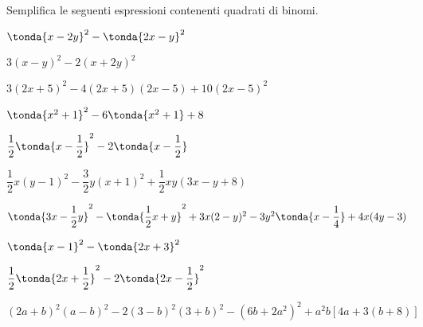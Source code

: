\begin{esercizio}[*]
\label{ese:11.8}
Semplifica le seguenti espressioni contenenti quadrati di binomi.

\begin{enumeratea}
\spazielenx
\item \(\tonda{x-2y}^{2}-\tonda{2x-y}^{2}\) 
\item \(3(x-y)^{2}-2(x+2y)^{2}\)
\item \(3(2x+5)^{2}-4(2x+5)(2x-5)+10(2x-5)^{2}\)
\item \(\tonda{x^{2}+1}^{2}-6\tonda{x^{2}+1}+8\)
\item \(\dfrac{1}{2}\tonda{x-\dfrac{1}{2}}^{2}-
      2\tonda{x-\dfrac{1}{2}}\)
\sol{ \dots }
\item 
\(\dfrac{1}{2}x(y-1)^{2}-\dfrac{3}{2}y(x+1)^{2}+\dfrac{1}{2}{xy}(3x-y+8)\)
\item \(\tonda{3x-\dfrac{1}{2}y}^{2}-
    \tonda{\dfrac{1}{2}x+y}^{2}+3x(2-y)^{2}
    -3y^{2}\tonda{x-\dfrac{1}{4}}+4x(4y-3)\)
\item \(\tonda{x-1}^{2}-\tonda{2x+3}^{2}\)
\item \(\dfrac{1}{2}\tonda{2x+\dfrac{1}{2}}^{2}-2\tonda{2x-
    \dfrac{1}{2}}^{2}\)
\item \((2a+b)^{2}(a-b)^{2}-2(3-b)^{2}(3+b)^{2}-
    (6b+2a^{2})^{2}+a^{2}b[4a+3(b+8)]\)
\end{enumeratea}
\end{esercizio}


